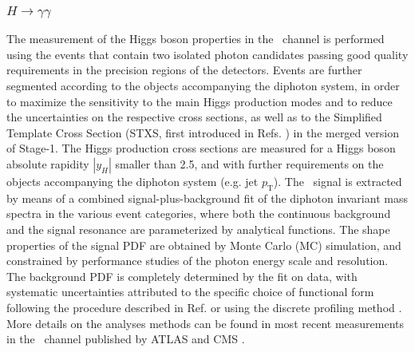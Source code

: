 \subsubsection{$H \to \gamma\gamma$}
\label{sec:Hgammagamma}

The measurement of the Higgs boson properties in the \Hyy\ channel is performed using the events that contain two isolated photon candidates passing good quality requirements in the precision regions of the detectors. Events are further segmented according to the objects accompanying the diphoton system, in order to maximize the sensitivity to the main Higgs production modes and to reduce the uncertainties on the respective cross sections, as well as to the Simplified Template Cross Section (STXS, first introduced in Refs. \cite{deFlorian:2016spz,Badger:2016bpw}) in the merged version of Stage-1.
The Higgs production cross sections are measured for a Higgs boson absolute rapidity $|y_H|$ smaller than 2.5, and with further requirements on the objects accompanying the diphoton system (e.g. jet $p_\mathrm{T}$).
The \Hyy\ signal is extracted by means of a combined signal-plus-background fit of the diphoton invariant mass spectra in the various event categories, where both the continuous background and the signal resonance are parameterized by analytical functions. The shape properties of the signal PDF are obtained by Monte Carlo (MC) simulation, and constrained by performance studies of the photon energy scale and resolution. The background PDF is completely determined by the fit on data, with systematic uncertainties attributed to the specific choice of functional form following the procedure described in Ref. \cite{Aad:2012tfa} or using the discrete profiling method \cite{Dauncey:2014xga}. More details on the analyses methods can be found in most recent measurements in the \Hyy\ channel published by ATLAS \cite{ATLAS:2018uso} and CMS \cite{Sirunyan:2018ouh}. 

